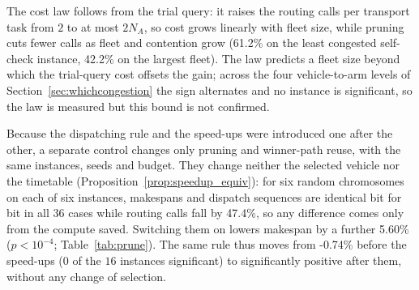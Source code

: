 \documentclass[preprint,review,12pt,authoryear,doubleblind]{elsarticle}
\newcommand{\RouteCallCutLo}{42.2\%}     %
\newcommand{\RouteCallCutHi}{61.2\%}     %
\newcommand{\RouteCallCut}{47.4\%}
\newcommand{\GainPrune}{5.60\%}
\newcommand{\PPrune}{<10^{-4}}
\newcommand{\MatrixCells}{16}
\newcommand{\GainProbePre}{-0.74\%}      %
\begin{document}
The cost law follows from the trial query: it raises the routing calls per transport task from $2$ to at most $2N_A$, so cost grows linearly with fleet size, while pruning cuts fewer calls as fleet and contention grow (\RouteCallCutHi{} on the least congested self-check instance, \RouteCallCutLo{} on the largest fleet). The law predicts a fleet size beyond which the trial-query cost offsets the gain; across the four vehicle-to-arm levels of Section~\ref{sec:whichcongestion} the sign alternates and no instance is significant, so the law is measured but this bound is not confirmed.

Because the dispatching rule and the speed-ups were introduced one after the other, a separate control changes only pruning and winner-path reuse, with the same instances, seeds and budget. They change neither the selected vehicle nor the timetable (Proposition~\ref{prop:speedup_equiv}): for six random chromosomes on each of six instances, makespans and dispatch sequences are identical bit for bit in all $36$ cases while routing calls fall by \RouteCallCut{}, so any difference comes only from the compute saved. Switching them on lowers makespan by a further \GainPrune{} ($p\PPrune$; Table~\ref{tab:prune}). The same rule thus moves from \GainProbePre{} before the speed-ups ($0$ of the $\MatrixCells$ instances significant) to significantly positive after them, without any change of selection.
\end{document}
